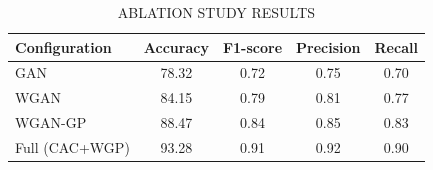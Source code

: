 \begin{table}[htbp]
\centering
\caption{ABLATION STUDY RESULTS}
\label{tab:ablation}
\begin{tabular}{lcccc}
\toprule
Configuration & Accuracy & F1-score & Precision & Recall \\
\midrule
GAN & 78.32 & 0.72 & 0.75 & 0.70 \\
WGAN & 84.15 & 0.79 & 0.81 & 0.77 \\
WGAN-GP & 88.47 & 0.84 & 0.85 & 0.83 \\
Full (CAC+WGP) & 93.28 & 0.91 & 0.92 & 0.90 \\
\bottomrule
\end{tabular}
\end{table}
